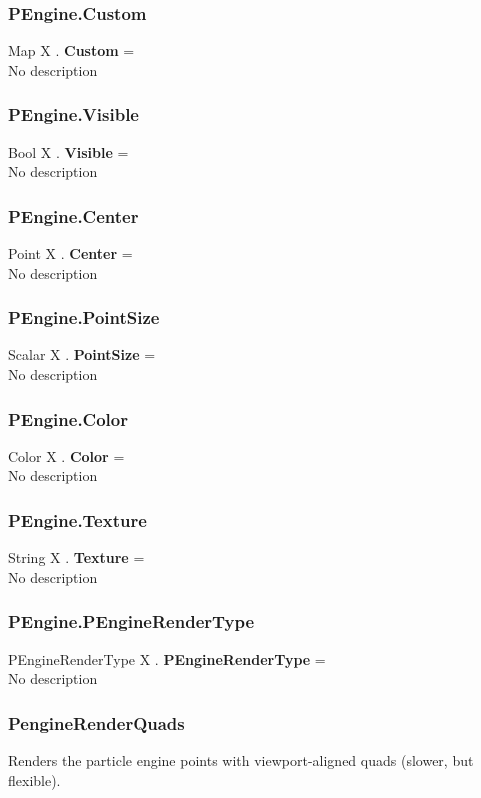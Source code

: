 \documentclass[10pt]{book}
\begin{document}
\subsubsection{PEngine.Custom \label{F:PEngine:Custom}}
Map X . \textbf{Custom} = \\
No description

\subsubsection{PEngine.Visible \label{F:PEngine:Visible}}
Bool X . \textbf{Visible} = \\
No description

\subsubsection{PEngine.Center \label{F:PEngine:Center}}
Point X . \textbf{Center} = \\
No description

\subsubsection{PEngine.PointSize \label{F:PEngine:PointSize}}
Scalar X . \textbf{PointSize} = \\
No description

\subsubsection{PEngine.Color \label{F:PEngine:Color}}
Color X . \textbf{Color} = \\
No description

\subsubsection{PEngine.Texture \label{F:PEngine:Texture}}
String X . \textbf{Texture} = \\
No description

\subsubsection{PEngine.PEngineRenderType \label{F:PEngine:PEngineRenderType}}
PEngineRenderType X . \textbf{PEngineRenderType} = \\
No description

\subsubsection{PengineRenderQuads \label{T:PEngineRenderType|PengineRenderQuads}}
Renders the particle engine points with viewport-aligned quads (slower, but flexible).
\end{document}
